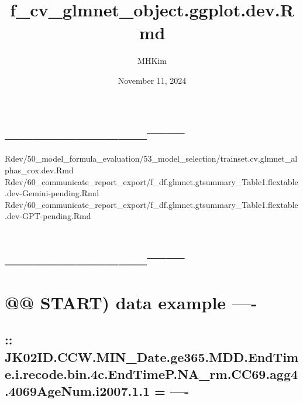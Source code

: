 \documentclass[
]{article}
\title{f\_cv\_glmnet\_object.ggplot.dev.Rmd}
\author{MHKim}
\date{November 11, 2024}
\begin{document}
\maketitle

{
\setcounter{tocdepth}{6}
\tableofcontents
}
\hypertarget{section}{%
\section{\_\_\_\_\_\_\_\_\_\_\textbar------}\label{section}}

Rdev/50\_model\_formula\_evaluation/53\_model\_selection/trainset.cv.glmnet\_alphas\_cox.dev.Rmd
Rdev/60\_communicate\_report\_export/f\_df.glmnet.gtsummary\_Table1.flextable.dev-Gemini-pending.Rmd
Rdev/60\_communicate\_report\_export/f\_df.glmnet.gtsummary\_Table1.flextable.dev-GPT-pending.Rmd

\hypertarget{section-1}{%
\section{\_\_\_\_\_\_\_\_\_\_\textbar------}\label{section-1}}

\hypertarget{start-data-example--}{%
\section{@@ START) data example ----}\label{start-data-example--}}

\hypertarget{jk02id.ccw.min_date.ge365.mdd.endtime.i.recode.bin.4c.endtimep.na_rm.cc69.agg4.4069agenum.i2007.1.1--}{%
\subsection{::
JK02ID.CCW.MIN\_Date.ge365.MDD.EndTime.i.recode.bin.4c.EndTimeP.NA\_rm.CC69.agg4.4069AgeNum.i2007.1.1
=
----}\label{jk02id.ccw.min_date.ge365.mdd.endtime.i.recode.bin.4c.endtimep.na_rm.cc69.agg4.4069agenum.i2007.1.1--}}
\end{document}
